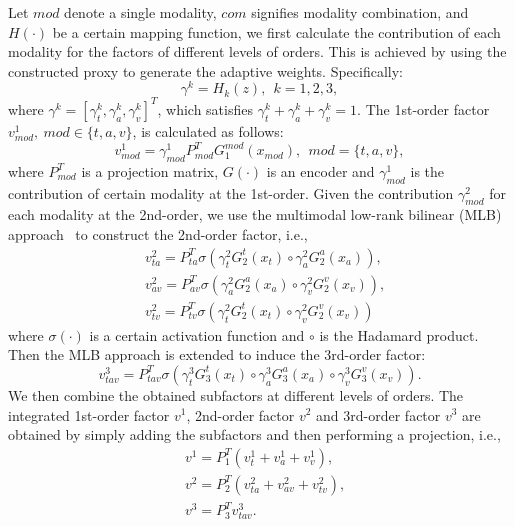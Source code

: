 \documentclass{article}
\begin{document}
Let $mod$ denote a single modality, $com$ signifies modality combination, and $H(\cdot)$ be a certain mapping function, we first calculate the contribution of each modality for the factors of different levels of orders.
This is achieved by using the constructed proxy to generate the adaptive weights.
Specifically:
\begin{equation}
	\gamma^k = H_k(z),\ \ k=1,2,3,
\end{equation}
where $\gamma^k=[\gamma_t^k,\gamma_{a}^k,\gamma_{v}^k]^T$, which satisfies $\gamma^k_t+\gamma^k_a+\gamma_v^k=1$. The 1st-order factor $v_{mod}^1,\ mod\in \{t,a,v\}$, is calculated as follows:
\begin{equation}
    v_{mod}^1 = \gamma^{1}_{mod}P_{mod}^T G_1^{mod}(x_{mod}),\ \ mod=\{t,a,v\},
\end{equation}
where $P_{mod}^T$ is a projection matrix, $G(\cdot)$ is an encoder and $\gamma^{1}_{mod}$ is the contribution of certain modality at the 1st-order.
Given the contribution $\gamma_{mod}^{2}$ for each modality at the 2nd-order, we use the multimodal low-rank bilinear (MLB) approach~\cite{mlb} to construct the 2nd-order factor, i.e.,
\begin{equation}
    \begin{split}
    & v_{ta}^2 = P_{ta}^T\sigma(\gamma_{t}^2 G_{2}^t(x_t) \circ \gamma_{a}^2 G_{2}^a(x_a)),\\
    & v_{av}^2 = P_{av}^T\sigma(\gamma_{a}^2G_{2}^a(x_a) \circ \gamma_{v}^2G_{2}^v(x_v)),\\
    & v_{tv}^2 = P_{tv}^T\sigma(\gamma_{t}^2G_{2}^t(x_t) \circ \gamma_{v}^2G_{2}^v(x_v))
	\end{split}
\end{equation}
where $\sigma(\cdot)$ is a certain activation function and $\circ$ is the Hadamard product. Then the MLB approach is extended to induce the 3rd-order factor:
\begin{equation}
	v_{tav}^3 = P_{tav}^T \sigma(\gamma_{t}^3G_{3}^t(x_t) \circ \gamma_{a}^3G_{3}^a(x_a) \circ \gamma_{v}^3G_{3}^v(x_v)).
\end{equation}
We then combine the obtained subfactors at different levels of orders. The integrated 1st-order factor $v^1$, 2nd-order factor $v^2$ and 3rd-order factor $v^3$ are obtained by simply adding the subfactors and then performing a projection, i.e.,
\begin{equation}
    \begin{split}
	& v^1 = P_1^T(v^1_{t} + v_a^1 + v_v^1),\\
    & v^2 = P_2^T(v^2_{ta} + v_{av}^2 + v_{tv}^2),\\
    & v^3 = P_3^T v_{tav}^3.
	\end{split}
\end{equation}
\end{document}
